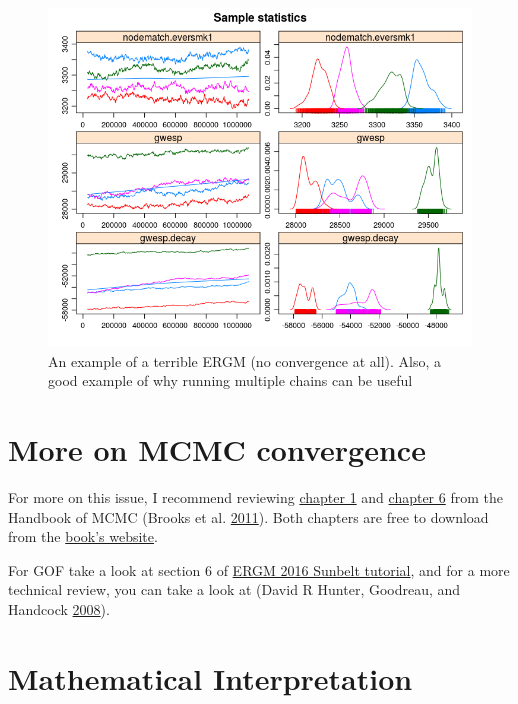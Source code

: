 \documentclass[]{book}
\begin{document}
\begin{figure}[!h]
\includegraphics[width=9.92in]{awful-chains} \caption{An example of a terrible ERGM (no convergence at all). Also, a good example of why running multiple chains can be useful}\label{fig:badconvergence}
\end{figure}

\hypertarget{more-on-mcmc-convergence}{%
\section{More on MCMC convergence}\label{more-on-mcmc-convergence}}

For more on this issue, I recommend reviewing \href{http://www.mcmchandbook.net/HandbookChapter1.pdf}{chapter 1} and \href{http://www.mcmchandbook.net/HandbookChapter6.pdf}{chapter 6} from the Handbook of MCMC (Brooks et al. \protect\hyperlink{ref-brooks2011}{2011}). Both chapters are free to download from the \href{http://www.mcmchandbook.net/HandbookSampleChapters.html}{book's website}.

For GOF take a look at section 6 of \href{https://statnet.csde.washington.edu/trac/raw-attachment/wiki/Sunbelt2016/ergm_tutorial.html}{ERGM 2016 Sunbelt tutorial}, and for a more technical review, you can take a look at (David R Hunter, Goodreau, and Handcock \protect\hyperlink{ref-HunterJASA2008}{2008}).

\hypertarget{mathematical-interpretation}{%
\section{Mathematical Interpretation}\label{mathematical-interpretation}}
\end{document}
